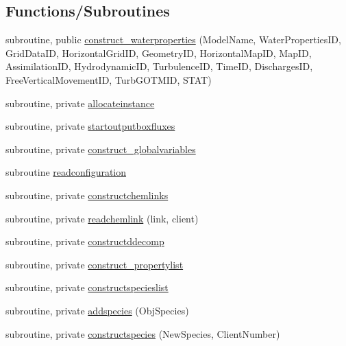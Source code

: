 \subsection*{Functions/\+Subroutines}
\begin{DoxyCompactItemize}
\item 
subroutine, public \mbox{\hyperlink{namespacemodulewaterproperties_a4b5a43f1052c697cd24d266317cd9be5}{construct\+\_\+waterproperties}} (Model\+Name, Water\+Properties\+ID, Grid\+Data\+ID, Horizontal\+Grid\+ID, Geometry\+ID, Horizontal\+Map\+ID, Map\+ID, Assimilation\+ID, Hydrodynamic\+ID, Turbulence\+ID, Time\+ID, Discharges\+ID, Free\+Vertical\+Movement\+ID, Turb\+G\+O\+T\+M\+ID, S\+T\+AT)
\item 
subroutine, private \mbox{\hyperlink{namespacemodulewaterproperties_ade36efb7389c89e5e20b885a9157f285}{allocateinstance}}
\item 
subroutine, private \mbox{\hyperlink{namespacemodulewaterproperties_ab589508866130f683e9d48bc7aeb235c}{startoutputboxfluxes}}
\item 
subroutine, private \mbox{\hyperlink{namespacemodulewaterproperties_a23995dd394222f8d9f2a52604e119d73}{construct\+\_\+globalvariables}}
\item 
subroutine \mbox{\hyperlink{namespacemodulewaterproperties_abba5d253e1014bd117f71c0ea3a37d58}{readconfiguration}}
\item 
subroutine, private \mbox{\hyperlink{namespacemodulewaterproperties_aac68ff898a933da27b109068c70a5f15}{constructchemlinks}}
\item 
subroutine, private \mbox{\hyperlink{namespacemodulewaterproperties_a9745c5b394a2c3fc11587bda05c362d6}{readchemlink}} (link, client)
\item 
subroutine, private \mbox{\hyperlink{namespacemodulewaterproperties_aea1140bf6cb4f7e78048a1a4a434435d}{constructddecomp}}
\item 
subroutine, private \mbox{\hyperlink{namespacemodulewaterproperties_a4eb6420a0cc772838269f9aed6c4394e}{construct\+\_\+propertylist}}
\item 
subroutine, private \mbox{\hyperlink{namespacemodulewaterproperties_aab78d8efe1058e8c8918e9ae266897d0}{constructspecieslist}}
\item 
subroutine, private \mbox{\hyperlink{namespacemodulewaterproperties_a3a5d5bfc3fea263034ab4c86a339e9f5}{addspecies}} (Obj\+Species)
\item 
subroutine, private \mbox{\hyperlink{namespacemodulewaterproperties_a34a1aa06efecd62c35348355c7bab36e}{constructspecies}} (New\+Species, Client\+Number)

\end{DoxyCompactItemize}
